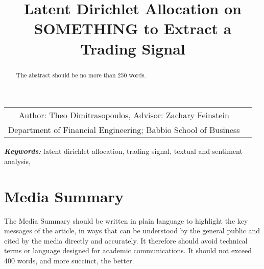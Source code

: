 \documentclass[]{hdsr}
\begin{document}

\begin{center}
  \title{Latent Dirichlet Allocation on SOMETHING to Extract a Trading Signal}
  \maketitle
  \thispagestyle{empty}
    \vspace*{.2in}

\begin{tabular}{cc}
    Author: Theo Dimitrasopoulos\upstairs{\affilone,*}, Advisor: Zachary Feinstein\upstairs{\affilone,**}
   \\[0.25ex]
   {\small \upstairs{\affilone}Department of Financial Engineering; Babbio School of Business} \\
  \end{tabular}

  \vspace*{0.4in}

\begin{abstract}
The abstract should be no more than 250 words.
\end{abstract}
\end{center}

\vspace*{0.15in}
\hspace{10pt}
  \small	
  \textbf{\textit{Keywords: }} {latent dirichlet allocation, trading signal, textual and sentiment analysis, }



\section*{Media Summary}
The Media Summary should be written in plain language to highlight the key messages of
the article, in ways that can be understood by the general public and cited by the media 
directly and accurately.  It therefore should avoid technical terms or language designed for
academic communications. It should not exceed 400 words, and more succinct, the better.
\end{document}
